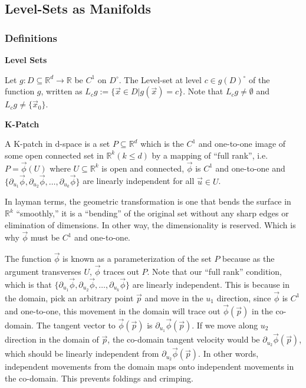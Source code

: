 \documentclass[11 pt, twoside]{article}
\begin{document}
\subsection{Level-Sets as Manifolds}

\subsubsection{Definitions}

\textbf{Level Sets}

Let $g: D \subseteq \mathbb{R}^d \to \mathbb{R}$ be
$C^1$ on $D^\circ$. The Level-set at level $c \in g(D)^\circ$ of the function $g$, written as
$L_c g := \{\vec{x} \in D | g(\vec{x}) = c\}$. Note that $L_c g \neq
\emptyset$ and $L_c g \neq \{\vec{x}_0\}$.

\textbf{K-Patch}

A K-patch in d-space is a set $P \subseteq \mathbb{R}^d$ which is the $C^1$
and one-to-one image of some open connected set in $\mathbb{R}^k (k \leq d)$
by a mapping of ``full rank'', i.e. $P = \vec{\phi}(U)$ where $U \subseteq
\mathbb{R}^k$ is open and connected, $\vec{\phi}$ is $C^1$ and one-to-one and
$\{\partial_{u_1} \vec{\phi}, \partial_{u_2} \vec{\phi}, \dots, \partial_{u_k}
\vec{\phi}\}$ are linearly independent for all $\vec{u} \in U$.

In layman terms, the geometric transformation is one that bends the surface in
$\mathbb{R}^k$ ``smoothly,'' it is a ``bending'' of the original set without
any sharp edges or elimination of dimensions. In other way, the dimensionality
is reserved. Which is why $\vec{\phi}$ must be $C^1$ and one-to-one.

The function $\vec{\phi}$ is known as a parameterization of the set $P$ because
as the argument transverses $U$, $\vec{\phi}$ traces out $P$. Note that our
``full rank'' condition, which is that $\{\partial_{u_1} \vec{\phi},
\partial_{u_2} \vec{\phi}, \dots, \partial_{u_k} \vec{\phi}\}$ are linearly
independent. This is because in the domain, pick an arbitrary point $\vec{p}$
and move in the $u_1$ direction, since $\vec{\phi}$ is $C^1$ and one-to-one,
this movement in the domain will trace out $\vec{\phi}(\vec{p})$ in the
co-domain. The tangent vector to $\vec{\phi}(\vec{p})$ is $\partial_{u_1}
\vec{\phi}(\vec{p})$. If we move along $u_2$ direction in the domain of
$\vec{p}$, the co-domain tangent velocity would be
$\partial_{u_2}\vec{\phi}(\vec{p})$, which should be linearly independent from
$\partial_{u_2}\vec{\phi}(\vec{p})$. In other words, independent movements from
the domain maps onto independent movements in the co-domain. This prevents
foldings and crimping.
\end{document}
